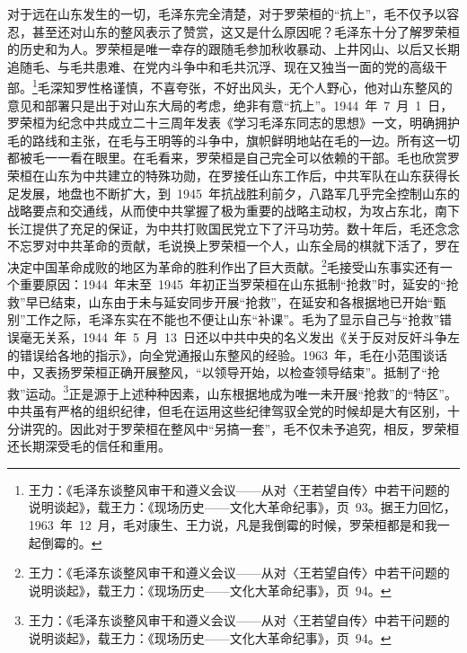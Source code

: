 对于远在山东发生的一切，毛泽东完全清楚，对于罗荣桓的“抗上”，毛不仅予以容忍，甚至还对山东的整风表示了赞赏，这又是什么原因呢？毛泽东十分了解罗荣桓的历史和为人。罗荣桓是唯一幸存的跟随毛参加秋收暴动、上井冈山、以后又长期追随毛、与毛共患难、在党内斗争中和毛共沉浮、现在又独当一面的党的高级干部。\footnote{王力：《毛泽东谈整风审干和遵义会议——从对〈王若望自传〉中若干问题的说明谈起》，载王力：《现场历史——文化大革命纪事》，页~93。据王力回忆，1963~年~12~月，毛对康生、王力说，凡是我倒霉的时候，罗荣桓都是和我一起倒霉的。}毛深知罗性格谨慎，不喜夸张，不好出风头，无个人野心，他对山东整风的意见和部署只是出于对山东大局的考虑，绝非有意“抗上”。1944~年~7~月~1~日，罗荣桓为纪念中共成立二十三周年发表《学习毛泽东同志的思想》一文，明确拥护毛的路线和主张，在毛与王明等的斗争中，旗帜鲜明地站在毛的一边。所有这一切都被毛一一看在眼里。在毛看来，罗荣桓是自己完全可以依赖的干部。毛也欣赏罗荣桓在山东为中共建立的特殊功勋，在罗接任山东工作后，中共军队在山东获得长足发展，地盘也不断扩大，到~1945~年抗战胜利前夕，八路军几乎完全控制山东的战略要点和交通线，从而使中共掌握了极为重要的战略主动权，为攻占东北，南下长江提供了充足的保证，为中共打败国民党立下了汗马功劳。数十年后，毛还念念不忘罗对中共革命的贡献，毛说换上罗荣桓一个人，山东全局的棋就下活了，罗在决定中国革命成败的地区为革命的胜利作出了巨大贡献。\footnote{王力：《毛泽东谈整风审干和遵义会议——从对〈王若望自传〉中若干问题的说明谈起》，载王力：《现场历史——文化大革命纪事》，页~94。}毛接受山东事实还有一个重要原因：1944~年末至~1945~年初正当罗荣桓在山东抵制“抢救”时，延安的“抢救”早已结束，山东由于未与延安同步开展“抢救”，在延安和各根据地已开始“甄别”工作之际，毛泽东实在不能也不便让山东“补课”。毛为了显示自己与“抢救”错误毫无关系，1944~年~5~月~13~日还以中共中央的名义发出《关于反对反奸斗争左的错误给各地的指示》，向全党通报山东整风的经验。1963~年，毛在小范围谈话中，又表扬罗荣桓正确开展整风，“以领导开始，以检查领导结束”。抵制了“抢救”运动。\footnote{王力：《毛泽东谈整风审干和遵义会议——从对〈王若望自传〉中若干问题的说明谈起》，载王力：《现场历史——文化大革命纪事》，页~94。}正是源于上述种种因素，山东根据地成为唯一未开展“抢救”的“特区”。中共虽有严格的组织纪律，但毛在运用这些纪律驾驭全党的时候却是大有区别，十分讲究的。因此对于罗荣桓在整风中“另搞一套”，毛不仅未予追究，相反，罗荣桓还长期深受毛的信任和重用。